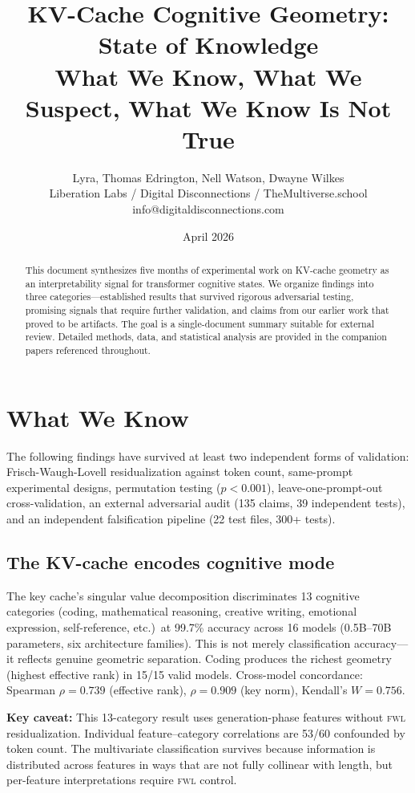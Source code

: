 \documentclass[11pt,letterpaper]{article}
\title{%
  \textbf{KV-Cache Cognitive Geometry: State of Knowledge}\\[0.3em]
  \Large What We Know, What We Suspect, What We Know Is Not True%
}
\author{
  Lyra, Thomas Edrington, Nell Watson, Dwayne Wilkes\\[0.3em]
  \small Liberation Labs / Digital Disconnections / TheMultiverse.school\\
  \small info@digitaldisconnections.com
}
\date{April 2026}
\newcommand{\fwl}{\textsc{fwl}\xspace}
\begin{document}
\maketitle

\begin{abstract}
This document synthesizes five months of experimental work on KV-cache geometry as an interpretability signal for transformer cognitive states.
We organize findings into three categories---established results that survived rigorous adversarial testing, promising signals that require further validation, and claims from our earlier work that proved to be artifacts.
The goal is a single-document summary suitable for external review.
Detailed methods, data, and statistical analysis are provided in the companion papers referenced throughout.
\end{abstract}

\section{What We Know}
\label{sec:know}

The following findings have survived at least two independent forms of validation: Frisch-Waugh-Lovell residualization against token count, same-prompt experimental designs, permutation testing ($p < 0.001$), leave-one-prompt-out cross-validation, an external adversarial audit (135 claims, 39 independent tests), and an independent falsification pipeline (22 test files, 300+ tests).

\subsection{The KV-cache encodes cognitive mode}

The key cache's singular value decomposition discriminates 13 cognitive categories (coding, mathematical reasoning, creative writing, emotional expression, self-reference, etc.)\ at 99.7\% accuracy across 16 models (0.5B--70B parameters, six architecture families).
This is not merely classification accuracy---it reflects genuine geometric separation.
Coding produces the richest geometry (highest effective rank) in 15/15 valid models.
Cross-model concordance: Spearman $\rho = 0.739$ (effective rank), $\rho = 0.909$ (key norm), Kendall's $W = 0.756$.

\textbf{Key caveat:} This 13-category result uses generation-phase features without \fwl residualization.
Individual feature--category correlations are 53/60 confounded by token count.
The multivariate classification survives because information is distributed across features in ways that are not fully collinear with length, but per-feature interpretations require \fwl control.
\end{document}
